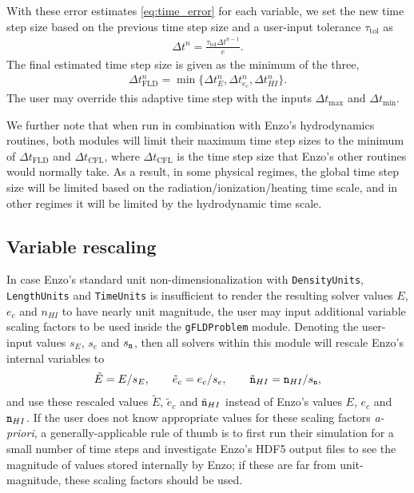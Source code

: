 \documentclass[letterpaper,10pt]{article}
\renewcommand{\(}{\left(}
\renewcommand{\)}{\right)}
\newcommand{\dt}{\Delta t}
\newcommand{\mn}{{\tt n}}
\begin{document}
With these error estimates \eqref{eq:time_error} for each variable, we
set the new time step size based on the previous time step size and a
user-input tolerance $\tau_{\text{tol}}$ as
\begin{align}
\label{eq:time_estimate}
  \dt^{n} = \frac{\tau_{\text{tol}} \dt^{n-1}}{e}.
\end{align}
The final estimated time step size is given as the minimum of the
three,
\begin{align}
\label{eq:FLD_time_estimate}
  \dt_{\text{FLD}}^{n} =
  \min\{\dt_{E}^{n},\dt_{e_c}^{n},\dt_{HI}^{n}\}. 
\end{align}
The user may override this adaptive time step with the inputs
$\dt_{\text{max}}$ and $\dt_{\text{min}}$. 

We further note that when run in combination with Enzo's hydrodynamics
routines, both modules will limit their maximum time step sizes to the
minimum of $\dt_{\text{FLD}}$ and $\dt_{\text{CFL}}$, where
$\dt_{\text{CFL}}$ is the time step size that Enzo's other routines
would normally take.  As a result, in some physical regimes, the
global time step size will be limited based on the
radiation/ionization/heating time scale, and in other regimes it will
be limited by the hydrodynamic time scale.




\subsection{Variable rescaling}
\label{sec:variable_rescaling}

In case Enzo's standard unit non-dimensionalization with 
{\tt DensityUnits}, {\tt LengthUnits} and {\tt TimeUnits} is
insufficient to render the resulting solver values $E$, $e_c$ and
$n_{HI}$ to have nearly unit magnitude, the user may input additional
variable scaling factors to be used inside the {\tt gFLDProblem}
module.  Denoting the user-input values $s_E$, $s_e$ and $s_{\mn}$,
then all solvers within this module will rescale Enzo's internal
variables to 
\begin{align}
\label{eq:variable_rescaling}
  \tilde{E} = E / s_E, \qquad \tilde{e}_c = e_c / s_e, \qquad \tilde{\mn}_{HI} = \mn_{HI} / s_{\mn},
\end{align}
and use these rescaled values $\tilde{E}$, $\tilde{e}_c$ and
$\tilde{\mn}_{HI}$ instead of Enzo's values $E$, $e_c$ and
$\mn_{HI}$.  If the user does not know appropriate values for these
scaling factors {\em a-priori}, a generally-applicable rule of thumb
is to first run their simulation for a small number of time steps and
investigate Enzo's HDF5 output files to see the magnitude of values
stored internally by Enzo; if these are far from unit-magnitude, these 
scaling factors should be used.
\end{document}
